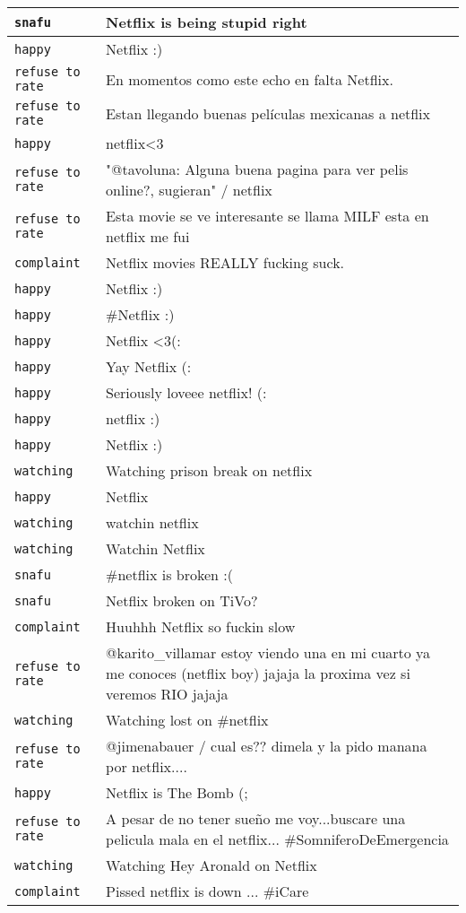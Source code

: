 \begin{center}
\begin{longtable}{|l|p{120mm}|}
      \tabularnewline\hline
         \texttt{snafu} & Netflix is being stupid right
      \tabularnewline\hline
         \texttt{happy} & Netflix :)
      \tabularnewline\hline
         \texttt{refuse to rate} & En momentos como este echo en falta Netflix.
      \tabularnewline\hline
         \texttt{refuse to rate} & Estan llegando buenas películas mexicanas a netflix
      \tabularnewline\hline
         \texttt{happy} & netflix<3
      \tabularnewline\hline
         \texttt{refuse to rate} & "@tavoluna: Alguna buena pagina para ver pelis online?, sugieran" / netflix
      \tabularnewline\hline
         \texttt{refuse to rate} & Esta movie se ve interesante se llama MILF esta en netflix me fui
      \tabularnewline\hline
         \texttt{complaint} & Netflix movies REALLY fucking suck.
      \tabularnewline\hline
         \texttt{happy} & Netflix :)
      \tabularnewline\hline
         \texttt{happy} & \#Netflix :)
      \tabularnewline\hline
         \texttt{happy} & Netflix <3(:
      \tabularnewline\hline
         \texttt{happy} & Yay Netflix (:
      \tabularnewline\hline
         \texttt{happy} & Seriously loveee netflix! (:
      \tabularnewline\hline
         \texttt{happy} & netflix :)
      \tabularnewline\hline
         \texttt{happy} & Netflix :)
      \tabularnewline\hline
         \texttt{watching} & Watching prison break on netflix
      \tabularnewline\hline
         \texttt{happy} & Netflix
      \tabularnewline\hline
         \texttt{watching} & watchin netflix
      \tabularnewline\hline
         \texttt{watching} & Watchin Netflix
      \tabularnewline\hline
         \texttt{snafu} & \#netflix is broken :(
      \tabularnewline\hline
         \texttt{snafu} & Netflix broken on TiVo?
      \tabularnewline\hline
         \texttt{complaint} & Huuhhh Netflix so fuckin slow
      \tabularnewline\hline
         \texttt{refuse to rate} & @karito\_villamar estoy viendo una en mi cuarto ya me conoces (netflix boy) jajaja la proxima vez si veremos RIO jajaja
      \tabularnewline\hline
         \texttt{watching} & Watching lost on \#netflix
      \tabularnewline\hline
         \texttt{refuse to rate} & @jimenabauer / cual es?? dimela y la pido manana por netflix....
      \tabularnewline\hline
         \texttt{happy} & Netflix is The Bomb (;
      \tabularnewline\hline
         \texttt{refuse to rate} & A pesar de no tener sueño me voy...buscare una pelicula mala en el netflix... \#SomniferoDeEmergencia
      \tabularnewline\hline
         \texttt{watching} & Watching Hey Aronald on Netflix
      \tabularnewline\hline
         \texttt{complaint} & Pissed netflix is down ... \#iCare

\end{longtable}
\end{center}
